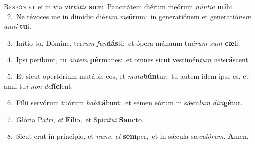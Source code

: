 \lettrine{\initial\textcolor{\initialcolor}{R}}{espóndit} ei in via vir\-\textit{tú}\-\textit{tis} \textbf{su}\-æ:~\star Paucitátem diérum meórum \textit{nún}\-\textit{ti}\textit{a} \textbf{mi}\-hi.\\
{\numbfont\textcolor{\numbcolor}{~2.}}~Ne révoces me in dimídio dié\textit{rum} \textit{me}\-\textbf{ó}rum:~\star in generatiónem et generatió\textit{nem} \textit{an}\-\textit{ni} \textbf{tu}\-i.\par
{\numbfont\textcolor{\numbcolor}{~3.}}~Inítio tu, Dómine, ter\textit{ram} \textit{fun}\-\textbf{dás}ti:~\star et ópera mánuum tu\-\textit{á}\-\textit{rum} \textit{sunt} \textbf{cæ}\-li.\par
{\numbfont\textcolor{\numbcolor}{~4.}}~Ipsi períbunt, tu \textit{au}\-\textit{tem} \textbf{pér}\-manes:~\star et omnes sicut vestimén\textit{tum} \textit{ve}\-\textit{te}\textbf{rá}scent.\par
{\numbfont\textcolor{\numbcolor}{~5.}}~Et sicut opertórium mutábis eos, et \textit{mu}\-\textit{ta}\textbf{bún}tur:~\star tu autem idem ipse es, et anni tu\textit{i} \textit{non} \textit{de}\-\textbf{fí}\textbf{ci}ent.\par
{\numbfont\textcolor{\numbcolor}{~6.}}~Fílii servórum tuórum \textit{ha}\-\textit{bi}\textbf{tá}bunt:~\star et semen eórum in sǽcu\textit{lum} \textit{di}\-\textit{ri}\textbf{gé}tur.\par
{\numbfont\textcolor{\numbcolor}{~7.}}~Glória Pa\-\textit{tri}\-, \textit{et} \textbf{Fí}\-lio,~\star et Spi\-\textit{rí}\-\textit{tu}\textit{i} \textbf{Sanc}\-to.\par
{\numbfont\textcolor{\numbcolor}{~8.}}~Sicut erat in princípio, et \textit{nunc}\-, \textit{et} \textbf{sem}\-per,~\star et in sǽcula sæ\-\textit{cu}\-\textit{ló}\textit{rum}. \textbf{A}\-men.\par
